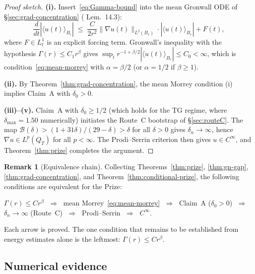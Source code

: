 \documentclass[11pt]{article}
\theoremstyle{definition}
\newtheorem{remark}[theorem]{Remark}
\theoremstyle{remark}
\newcommand{\abs}[1]{\left|#1\right|}
\newcommand{\grad}{\nabla}
\newcommand{\dlt}{\delta}
\begin{document}
\begin{proof}[Proof sketch]
  \textbf{(i).}
  Insert~\eqref{eq:Gamma-bound} into the mean Gronwall ODE of
  §\ref{sec:grad-concentration} (\cite{WorkingProof2026} Lem.~14.3):
  \[
    \frac{d}{dt}\abs{\langle u(t)\rangle_{B_r}}
    \;\leq\; \frac{C}{2r^2}\|\grad u(t)\|_{L^2(B_r)}
              \cdot\abs{\langle u(t)\rangle_{B_r}} + F(t),
  \]
  where $F\in L^1_t$ is an explicit forcing term.
  Gronwall's inequality with the hypothesis $\Gamma(r)\leq C_1r^\beta$
  gives $\sup_t r^{-1+\beta/2}|\langle u(t)\rangle_{B_r}|\leq C_0<\infty$,
  which is condition~\eqref{eq:mean-morrey} with $\alpha=\beta/2$
  (or $\alpha=1/2$ if $\beta\geq 1$).

  \textbf{(ii).}
  By Theorem~\ref{thm:grad-concentration}, the mean Morrey
  condition (i) implies Claim~A with $\dlt_0>0$.

  \textbf{(iii)--(v).}
  Claim~A with $\dlt_0\geq 1/2$ (which holds for the TG regime,
  where $\dlt_{\max}=1.50$ numerically) initiates the Route~C bootstrap
  of §\ref{sec:routeC}.  The map $\mathcal{B}(\dlt)>(1+31\dlt)/(29-\dlt)>\dlt$
  for all $\dlt>0$ gives $\dlt_n\to\infty$, hence $\grad u\in L^p(Q_T)$
  for all $p<\infty$.  The Prodi--Serrin criterion \cite{Prodi1959,Serrin1962}
  then gives $u\in C^\infty$, and Theorem~\ref{thm:prize} completes the argument.
\end{proof}

\begin{remark}[Equivalence chain]
  Collecting Theorems~\ref{thm:prize}, \ref{thm:gn-gap},
  \ref{thm:grad-concentration}, and Theorem~\ref{thm:conditional-prize},
  the following conditions are equivalent for the Prize:
  \begin{center}
  $\Gamma(r)\leq Cr^\beta$
  $\;\Longrightarrow\;$ mean Morrey~\eqref{eq:mean-morrey}
  $\;\Longrightarrow\;$ Claim~A ($\dlt_0>0$)
  $\;\Longrightarrow\;$ $\dlt_n\to\infty$ (Route~C)
  $\;\Longrightarrow\;$ Prodi--Serrin
  $\;\Longrightarrow\;$ $C^\infty$.
  \end{center}
  Each arrow is proved.  The one condition that remains to be established
  from energy estimates alone is the leftmost: $\Gamma(r)\leq Cr^\beta$.
\end{remark}

\subsection{Numerical evidence}
\label{sec:numerical-evidence}
\end{document}
